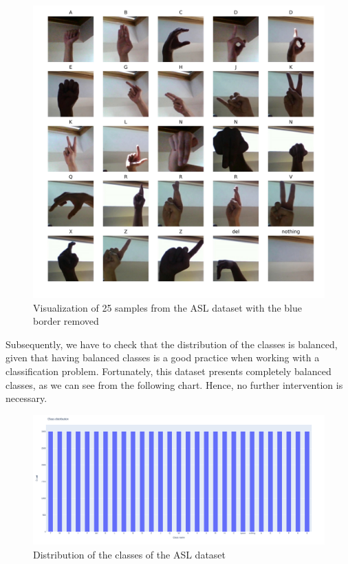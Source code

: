 \documentclass{Configuration_Files/PoliMi3i_thesis}
\begin{document}
\begin{figure}[H]
    \centering
    \includegraphics[width=\textwidth]{Figures/eda/asl_samples_processed.jpg}
    \caption{Visualization of 25 samples from the ASL dataset with the blue border removed}
    \label{fig:asl_processed}
\end{figure}

Subsequently,  we have to check that the distribution of the classes is balanced, given that having balanced classes is a good practice when working with a classification problem. 
Fortunately, this dataset presents completely balanced classes, as we can see from the following chart. Hence, no further intervention is necessary.

\begin{figure}[H]
    \centering
    \includegraphics[width=\textwidth]{Figures/eda/class distribution.png}
    \caption{Distribution of the classes of the ASL dataset}
    \label{fig:class_distribution}
\end{figure}
\end{document}
